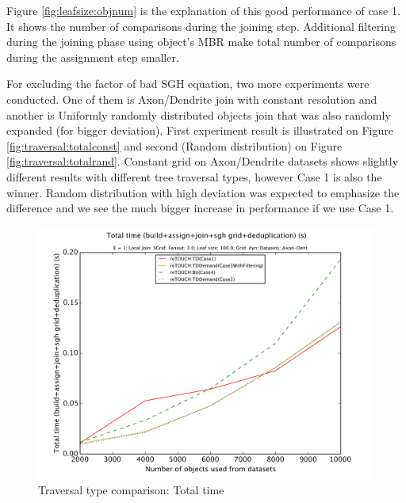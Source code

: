 \documentclass{sig-alternate}
\newcommand{\fref}[1]{Figure \ref{#1}}
\begin{document}
\fref{fig:leafsize:objnum} is the explanation of this good performance of case 1. It shows the number of comparisons during the joining step. Additional filtering during the joining phase using object's MBR make total number of comparisons during the assignment step smaller.

For excluding the factor of bad SGH equation, two more experiments were conducted. One of them is Axon/Dendrite join with constant resolution and another is Uniformly randomly distributed objects join that was also randomly expanded (for bigger deviation). First experiment result is illustrated on \fref{fig:traversal:totalconst} and second (Random distribution) on \fref{fig:traversal:totalrand}. Constant grid on Axon/Dendrite datasets shows slightly different results with different tree traversal types, however Case 1 is also the winner. Random distribution with high deviation was expected to emphasize the difference and we see the much bigger increase in performance if we use Case 1.

\begin{figure}[htb]
    \begin{center}
        \includegraphics[width=\columnwidth]{traversalTypeFixed/total}
        \caption{Traversal type comparison: Total time}
        \label{fig:traversal:total}
      \end{center}
\end{figure}
\end{document}
